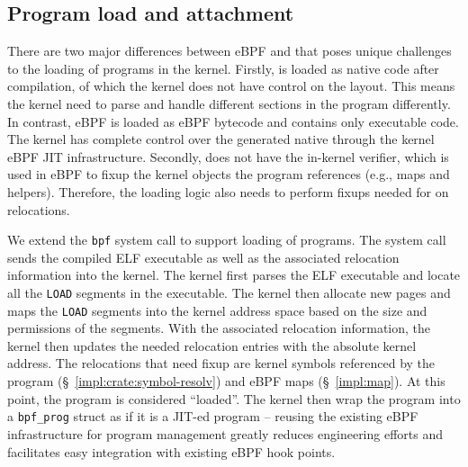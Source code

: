 \subsection{Program load and attachment}
There are two major differences between eBPF and \projname{} that poses unique
    challenges to the loading of \projname{} programs in the kernel.
Firstly, \projname{} is loaded as native code after compilation, of which the
    kernel does not have control on the layout.
This means the kernel need to parse and handle different sections in the
    program differently.
In contrast, eBPF is loaded as eBPF bytecode and contains only executable code.
The kernel has complete control over the generated native through the kernel
    eBPF JIT infrastructure.
Secondly, \projname{} does not have the in-kernel verifier, which is used in
    eBPF to fixup the kernel objects the program references (e.g., maps and
    helpers).
Therefore, the loading logic also needs to perform fixups needed for
    \projname{} on relocations.

We extend the \texttt{bpf} system call to support loading of \projname{}
    programs.
The system call sends the compiled ELF executable as well as the associated
    relocation information into the kernel.
The kernel first parses the ELF executable and locate all the \texttt{LOAD}
    segments in the executable.
The kernel then allocate new pages and maps the \texttt{LOAD} segments into the
    kernel address space based on the size and permissions of the segments.
With the associated relocation information, the kernel then updates the needed
    relocation entries with the absolute kernel address.
The relocations that need fixup are kernel symbols referenced by the
    \projname{} program (\S~\ref{impl:crate:symbol-resolv}) and eBPF maps
    (\S~\ref{impl:map}).
At this point, the program is considered ``loaded''.
The kernel then wrap the program into a \texttt{bpf\_prog} struct as if it is a
    JIT-ed program -- reusing the existing eBPF infrastructure for program
    management greatly reduces engineering efforts and facilitates easy
    integration with existing eBPF hook points.

